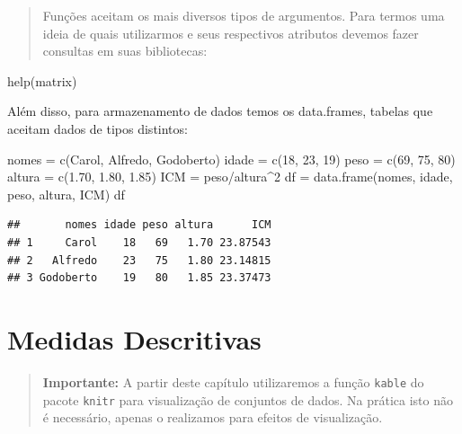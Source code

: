 \documentclass[
]{book}
\newenvironment{Shaded}{\begin{snugshade}}{\end{snugshade}}
\newcommand{\DecValTok}[1]{\textcolor[rgb]{0.00,0.00,0.81}{#1}}
\newcommand{\FloatTok}[1]{\textcolor[rgb]{0.00,0.00,0.81}{#1}}
\newcommand{\FunctionTok}[1]{\textcolor[rgb]{0.00,0.00,0.00}{#1}}
\newcommand{\NormalTok}[1]{#1}
\newcommand{\OtherTok}[1]{\textcolor[rgb]{0.56,0.35,0.01}{#1}}
\newcommand{\SpecialCharTok}[1]{\textcolor[rgb]{0.00,0.00,0.00}{#1}}
\newcommand{\StringTok}[1]{\textcolor[rgb]{0.31,0.60,0.02}{#1}}
\begin{document}
\begin{quote}
Funções aceitam os mais diversos tipos de argumentos. Para termos uma ideia de quais utilizarmos e seus respectivos atributos devemos fazer consultas em suas bibliotecas:
\end{quote}

\begin{Shaded}
\begin{Highlighting}[]
\FunctionTok{help}\NormalTok{(matrix)}
\end{Highlighting}
\end{Shaded}

Além disso, para armazenamento de dados temos os data.frames, tabelas que aceitam dados de tipos distintos:

\begin{Shaded}
\begin{Highlighting}[]
\NormalTok{nomes }\OtherTok{=} \FunctionTok{c}\NormalTok{(}\StringTok{\textquotesingle{}Carol\textquotesingle{}}\NormalTok{, }\StringTok{\textquotesingle{}Alfredo\textquotesingle{}}\NormalTok{, }\StringTok{\textquotesingle{}Godoberto\textquotesingle{}}\NormalTok{)}
\NormalTok{idade }\OtherTok{=} \FunctionTok{c}\NormalTok{(}\DecValTok{18}\NormalTok{, }\DecValTok{23}\NormalTok{, }\DecValTok{19}\NormalTok{)}
\NormalTok{peso }\OtherTok{=} \FunctionTok{c}\NormalTok{(}\DecValTok{69}\NormalTok{, }\DecValTok{75}\NormalTok{, }\DecValTok{80}\NormalTok{)}
\NormalTok{altura }\OtherTok{=} \FunctionTok{c}\NormalTok{(}\FloatTok{1.70}\NormalTok{, }\FloatTok{1.80}\NormalTok{, }\FloatTok{1.85}\NormalTok{)}
\NormalTok{ICM }\OtherTok{=}\NormalTok{ peso}\SpecialCharTok{/}\NormalTok{altura}\SpecialCharTok{\^{}}\DecValTok{2}
\NormalTok{df }\OtherTok{=} \FunctionTok{data.frame}\NormalTok{(nomes, idade, peso, altura, ICM)}
\NormalTok{df}
\end{Highlighting}
\end{Shaded}

\begin{verbatim}
##       nomes idade peso altura      ICM
## 1     Carol    18   69   1.70 23.87543
## 2   Alfredo    23   75   1.80 23.14815
## 3 Godoberto    19   80   1.85 23.37473
\end{verbatim}

\hypertarget{medidas-descritivas}{%
\chapter{Medidas Descritivas}\label{medidas-descritivas}}

\begin{quote}
\textbf{Importante:} A partir deste capítulo utilizaremos a função \texttt{kable} do pacote \texttt{knitr} para visualização de conjuntos de dados. Na prática isto não é necessário, apenas o realizamos para efeitos de visualização.
\end{quote}
\end{document}
